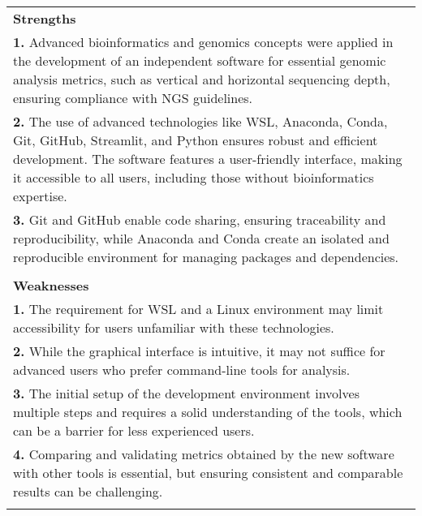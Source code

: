 \begin{table}[]
    \centering
    \caption{}
    \label{tab:swot}
    \begin{tabular}{p{\textwidth}}
    \rowcolor[HTML]{BECB2F} 
    \textbf{Strengths} \\ 
    \textbf{1.} Advanced bioinformatics and genomics concepts were applied in the development of an independent software for essential genomic analysis metrics, such as vertical and horizontal sequencing depth, ensuring compliance with NGS guidelines. \\
    \textbf{2.} The use of advanced technologies like WSL, Anaconda, Conda, Git, GitHub, Streamlit, and Python ensures robust and efficient development. The software features a user-friendly interface, making it accessible to all users, including those without bioinformatics expertise. \\
    \textbf{3.} Git and GitHub enable code sharing, ensuring traceability and reproducibility, while Anaconda and Conda create an isolated and reproducible environment for managing packages and dependencies. \\ \\
    \rowcolor[HTML]{F7AC00} 
    \textbf{Weaknesses} \\ 
    \textbf{1.} The requirement for WSL and a Linux environment may limit accessibility for users unfamiliar with these technologies. \\
    \textbf{2.} While the graphical interface is intuitive, it may not suffice for advanced users who prefer command-line tools for analysis. \\
    \textbf{3.} The initial setup of the development environment involves multiple steps and requires a solid understanding of the tools, which can be a barrier for less experienced users. \\
    \textbf{4.} Comparing and validating metrics obtained by the new software with other tools is essential, but ensuring consistent and comparable results can be challenging. \\ \\

\end{tabular}
\end{table}
